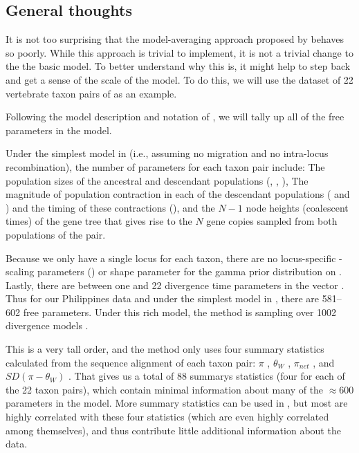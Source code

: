 \documentclass[letterpaper,12pt]{article}
\begin{document}
\begin{linenumbers}
\section*{General thoughts}
It is not too surprising that the model-averaging approach proposed by
\citet{Hickerson2013} behaves so poorly.
While this approach is trivial to implement, it is not a trivial change
to the the basic \msb model.
To better understand why this is, it might help to step back and get a
sense of the scale of the \msb model.
To do this, we will use the dataset of 22 vertebrate taxon pairs of
\citet{Oaks2012} as an example.

Following the model description and notation of \citet{Oaks2012}, we
will tally up all of the free parameters in the \msb model.

Under the simplest model in \msb (i.e., assuming no migration and
no intra-locus recombination), the number of parameters for each
taxon pair include:
The population sizes of the ancestral and descendant populations
(\ancestralTheta{}, , ),
The magnitude of population contraction in each of the descendant
populations ( and ) and the
timing of these contractions (\bottleTime{}), and the $N-1$ node heights
(coalescent times) of the gene tree that gives rise to the $N$ gene
copies sampled from both populations of the pair.

Because we only have a single locus for each taxon, there are no locus-specific
\myTheta{}-scaling parameters (\locusMutationRateScalar{}) or
\locusRateHetShapeParameter shape parameter for the gamma prior distribution on
\locusMutationRateScalar{}.
Lastly, there are between one and 22 divergence time parameters \divt{} in
the vector \divtvector.
Thus for our Philippines data and under the simplest model in \msb, there are
581--602 free parameters.
Under this rich model, the method is sampling over 1002 divergence models
\citep[i.e., the number of integer partitions of $Y=22$][]{Oaks2012}.

This is a very tall order, and the method only uses four summary statistics
calculated from the sequence alignment of each taxon pair:
$\pi$ \citep{Tajima1983}, $\theta_W$
\citep{Watterson1975}, $\pi_{net}$ \citep{Takahata1985}, and
$SD(\pi-\theta_W)$ \citep{Tajima1989}.
That gives us a total of 88 summarys statistics (four for each of the 22 taxon
pairs), which contain minimal information about many of the $\approx 600$
parameters in the model.
More summary statistics can be used in \msb, but most are highly correlated
with these four statistics (which are even highly correlated among themselves),
and thus contribute little additional information about the data.


\end{linenumbers}
\end{document}
